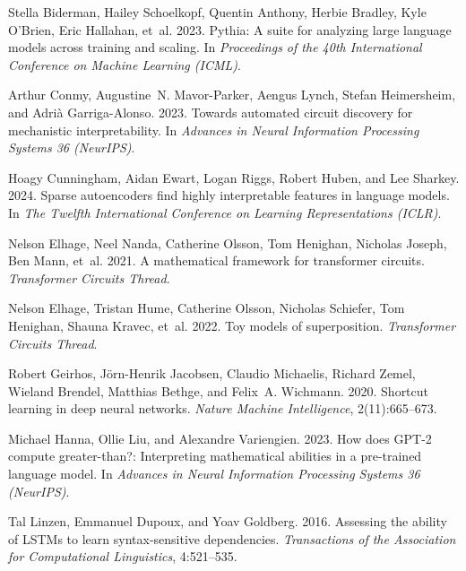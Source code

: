 \documentclass[11pt]{article}
\begin{document}
\begin{thebibliography}{}

Stella Biderman, Hailey Schoelkopf, Quentin Anthony, Herbie Bradley, Kyle
O'Brien, Eric Hallahan, et~al. 2023.
\newblock Pythia: A suite for analyzing large language models across training
  and scaling.
\newblock In \emph{Proceedings of the 40th International Conference on Machine
  Learning (ICML)}.

Arthur Conmy, Augustine~N. Mavor-Parker, Aengus Lynch, Stefan Heimersheim, and
  Adri\`a Garriga-Alonso. 2023.
\newblock Towards automated circuit discovery for mechanistic interpretability.
\newblock In \emph{Advances in Neural Information Processing Systems 36
  (NeurIPS)}.

Hoagy Cunningham, Aidan Ewart, Logan Riggs, Robert Huben, and Lee Sharkey.
  2024.
\newblock Sparse autoencoders find highly interpretable features in language
  models.
\newblock In \emph{The Twelfth International Conference on Learning
  Representations (ICLR)}.

Nelson Elhage, Neel Nanda, Catherine Olsson, Tom Henighan, Nicholas Joseph, Ben
  Mann, et~al. 2021.
\newblock A mathematical framework for transformer circuits.
\newblock \emph{Transformer Circuits Thread}.

Nelson Elhage, Tristan Hume, Catherine Olsson, Nicholas Schiefer, Tom Henighan,
  Shauna Kravec, et~al. 2022.
\newblock Toy models of superposition.
\newblock \emph{Transformer Circuits Thread}.

Robert Geirhos, J\"orn-Henrik Jacobsen, Claudio Michaelis, Richard Zemel,
  Wieland Brendel, Matthias Bethge, and Felix~A. Wichmann. 2020.
\newblock Shortcut learning in deep neural networks.
\newblock \emph{Nature Machine Intelligence}, 2(11):665--673.

Michael Hanna, Ollie Liu, and Alexandre Variengien. 2023.
\newblock How does {GPT}-2 compute greater-than?: Interpreting mathematical
  abilities in a pre-trained language model.
\newblock In \emph{Advances in Neural Information Processing Systems 36
  (NeurIPS)}.

Tal Linzen, Emmanuel Dupoux, and Yoav Goldberg. 2016.
\newblock Assessing the ability of {LSTM}s to learn syntax-sensitive
  dependencies.
\newblock \emph{Transactions of the Association for Computational Linguistics},
  4:521--535.


\end{thebibliography}
\end{document}
